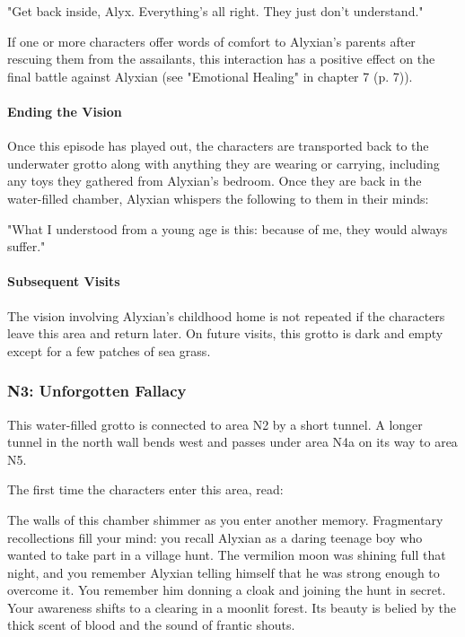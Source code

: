 \documentclass[a4paper, 11pt, bg=full, twocolumn, nooutline]{dndbook}
\begin{document}
\begin{DndReadAloud}
"Get back inside, Alyx. Everything's all right. They just don't understand."
\end{DndReadAloud}

If one or more characters offer words of comfort to Alyxian's parents after rescuing them from the assailants, this interaction has a positive effect on the final battle against Alyxian (see "Emotional Healing" in chapter 7 (p. 7)).

\paragraph{Ending the Vision}

Once this episode has played out, the characters are transported back to the underwater grotto along with anything they are wearing or carrying, including any toys they gathered from Alyxian's bedroom. Once they are back in the water-filled chamber, Alyxian whispers the following to them in their minds:

\begin{DndReadAloud}
"What I understood from a young age is this: because of me, they would always suffer."
\end{DndReadAloud}

\paragraph{Subsequent Visits}

The vision involving Alyxian's childhood home is not repeated if the characters leave this area and return later. On future visits, this grotto is dark and empty except for a few patches of sea grass.

\subsubsection{N3: Unforgotten Fallacy}

This water-filled grotto is connected to area N2 by a short tunnel. A longer tunnel in the north wall bends west and passes under area N4a on its way to area N5.

The first time the characters enter this area, read:

\begin{DndReadAloud}
The walls of this chamber shimmer as you enter another memory. Fragmentary recollections fill your mind: you recall Alyxian as a daring teenage boy who wanted to take part in a village hunt. The vermilion moon was shining full that night, and you remember Alyxian telling himself that he was strong enough to overcome it. You remember him donning a cloak and joining the hunt in secret.
Your awareness shifts to a clearing in a moonlit forest. Its beauty is belied by the thick scent of blood and the sound of frantic shouts.
\end{DndReadAloud}
\end{document}
